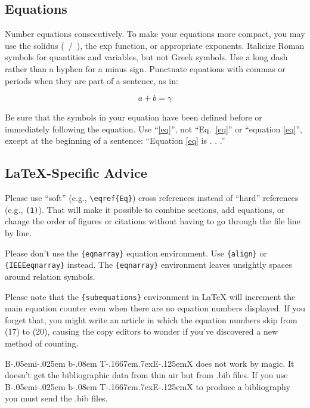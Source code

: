 \documentclass[conference]{IEEEtran}
\def\BibTeX{{\rm B\kern-.05em{\sc i\kern-.025em b}\kern-.08em
    T\kern-.1667em\lower.7ex\hbox{E}\kern-.125emX}}
\begin{document}
    \subsection{Equations}

    Number equations consecutively. To make your  equations more compact, you may use the 
    solidus (~/~), the exp function, or appropriate exponents. Italicize Roman symbols for 
    quantities and variables, but not Greek symbols. Use a long dash rather than a hyphen 
    for a minus sign. Punctuate equations with commas or periods when they are part of a 
    sentence, as in:

    \begin{equation}
        a+b=\gamma \label{eq}
    \end{equation}

    Be sure that the symbols in your equation have been defined before or immediately 
    following the equation. Use ``\eqref{eq}'', not ``Eq.~\eqref{eq}'' or 
    ``equation \eqref{eq}'', except at the beginning of a sentence: 
    ``Equation \eqref{eq} is . . .''


    \subsection{\LaTeX-Specific Advice}

    Please use ``soft'' (e.g., \verb|\eqref{Eq}|) cross references instead of ``hard'' 
    references (e.g., \verb|(1)|). That will make it possible to combine sections, add 
    equations, or change the order of figures or citations without having to go through 
    the file line by line.

    Please don't use the \verb|{eqnarray}| equation environment. Use \verb|{align}| or 
    \verb|{IEEEeqnarray}| instead. The \verb|{eqnarray}| environment leaves unsightly 
    spaces around relation symbols.

    Please note that the \verb|{subequations}| environment in {\LaTeX} will increment the 
    main equation counter even when there are no equation numbers displayed. If you forget 
    that, you might write an article in which the equation numbers skip from (17) to (20), 
    causing the copy editors to wonder if you've discovered a new method of counting.

    {\BibTeX} does not work by magic. It doesn't get the bibliographic data from thin air 
    but from .bib files. If you use {\BibTeX} to produce a bibliography you must send the 
    .bib files. 
\end{document}
